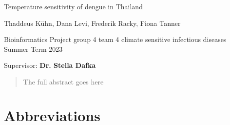 \documentclass[parskip]{scrartcl}
\newcommand{\workauthor}{Thaddeus Kühn, Dana Levi, Frederik Racky, Fiona Tanner}
\newcommand{\worktitle}{Temperature sensitivity of dengue in Thailand}
\newcommand{\workyear}{2023}
\newcommand{\supervisor}{Dr. Stella Dafka}
\begin{document}
\begin{titlepage}
    {
    {\vspace*{1cm}\Huge \worktitle{}}}
    
    
    {\Large \workauthor{}}

    
    
    	Bioinformatics Project group 4 team 4 climate sensitive infectious diseases Summer Term \workyear{}
    
    Supervisor: \textbf{\supervisor{}}
    
   
    

    
\end{titlepage}




\begin{abstract}

    The full abstract goes here
    

\end{abstract}



\tableofcontents

{\setlength{\parskip}{0.2cm}
\section*{Abbreviations}
    \begin{acronym}[LC-MS/MS23]
        
        
        
        
        
    \end{acronym}
}






\end{document}
